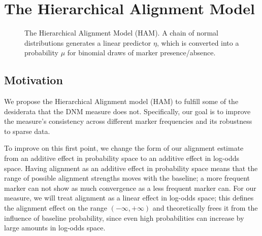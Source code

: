 \documentclass{acm_proc_article-sp}
\begin{document}



\section{The Hierarchical Alignment Model}

\begin{figure}
  \begin{center}
    
  \end{center}
  \caption{The Hierarchical Alignment Model (HAM). A chain of normal distributions generates a linear predictor $\eta$, which is converted into a probability $\mu$ for binomial draws of marker presence/absence.}\label{fig:model}
\end{figure}

\subsection{Motivation}
We propose the Hierarchical Alignment model (HAM) to fulfill some of the desiderata that the DNM measure does not.  Specifically, our goal is to improve the measure's consistency across different marker frequencies and its robustness to sparse data.  

To improve on this first point, we change the form of our alignment estimate from an additive effect in probability space to an additive effect in log-odds space. Having alignment as an additive effect in probability space means that the range of possible alignment strengths moves with the baseline; a more frequent marker can not show as much convergence as a less frequent marker can.  For our measure, we will treat alignment as a linear effect in log-odds space; this defines the alignment effect on the range $(-\infty,+\infty)$ and theoretically frees it from the influence of baseline probability, since even high probabilities can increase by large amounts in log-odds space.
\end{document}
